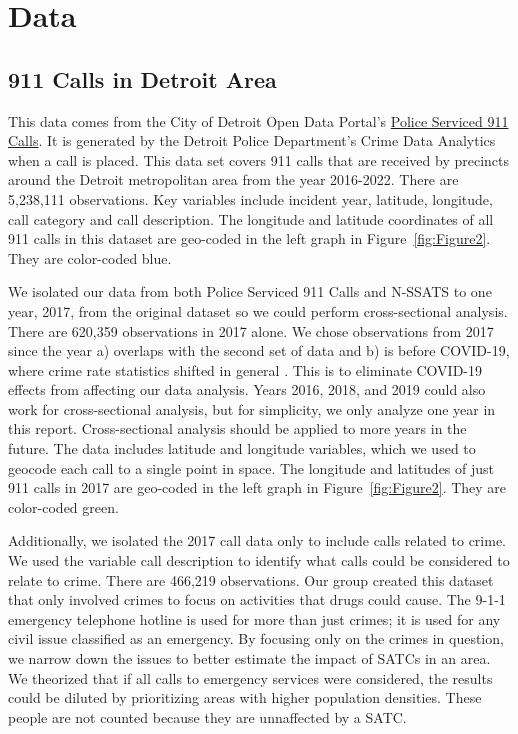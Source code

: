 \documentclass[12pt]{article}
\begin{document}
\section{Data}
\label{sec:data}

\subsection{911 Calls in Detroit Area}

This data comes from the City of Detroit Open Data Portal's   \href{https://data.detroitmi.gov/datasets/detroitmi::police-serviced-911-calls/about}{Police Serviced 911 Calls}. It is generated by the Detroit Police Department's Crime Data Analytics when a call is placed. This data set covers 911 calls that are received by precincts around the Detroit metropolitan area from the year 2016-2022. There are 5,238,111 observations. Key variables include incident year, latitude, longitude, call category and call description. The longitude and latitude coordinates of all 911 calls in this dataset are geo-coded in the left graph in Figure~\ref{fig:Figure2}. They are color-coded blue. 

We isolated our data from both Police Serviced 911 Calls and N-SSATS to one year, 2017, from the original dataset so we could perform cross-sectional analysis. There are 620,359 observations in 2017 alone. We chose observations from 2017 since the year a) overlaps with the second set of data and b) is before COVID-19, where crime rate statistics shifted in general \cite{covid_and_crime}. This is to eliminate COVID-19 effects from affecting our data analysis. Years 2016, 2018, and 2019 could also work for cross-sectional analysis, but for simplicity, we only analyze one year in this report. Cross-sectional analysis should be applied to more years in the future. The data includes latitude and longitude variables, which we used to geocode each call to a single point in space. The longitude and latitudes of just 911 calls in 2017 are geo-coded in the left graph in Figure~\ref{fig:Figure2}. They are color-coded green. 

Additionally, we isolated the 2017 call data only to include calls related to crime. We used the variable call description to identify what calls could be considered to relate to crime. There are 466,219 observations. Our group created this dataset that only involved crimes to focus on activities that drugs could cause. The 9-1-1 emergency telephone hotline is used for more than just crimes; it is used for any civil issue classified as an emergency. By focusing only on the crimes in question, we narrow down the issues to better estimate the impact of SATCs in an area. We theorized that if all calls to emergency services were considered, the results could be diluted by prioritizing areas with higher population densities. These people are not counted because they are unnaffected by a SATC.
\end{document}
